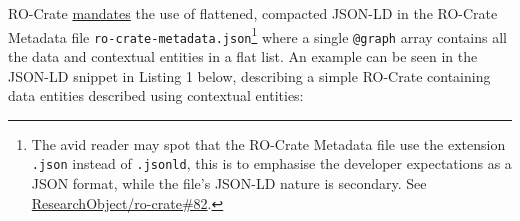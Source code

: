 {RO-Crate
\href{https://www.researchobject.org/ro-crate/1.1/appendix/jsonld.html}{mandates}
the use of flattened, compacted JSON-LD in the RO-Crate Metadata file
\texttt{ro-crate-metadata.json}\footnote{The avid reader may spot that
  the RO-Crate Metadata file use the extension \texttt{.json} instead of
  \texttt{.jsonld}, this is to emphasise the developer expectations as a
  JSON format, while the file's JSON-LD nature is secondary. See
  \href{https://github.com/ResearchObject/ro-crate/issues/82}{ResearchObject/ro-crate\#82}.}
where a single \texttt{@graph} array contains all the data and
contextual entities in a flat list. An example can be seen in the
JSON-LD snippet in Listing 1 below, describing a simple RO-Crate
containing data entities described using contextual entities:

\begin{Shaded}
\begin{Highlighting}[]
\FunctionTok{\{} \FunctionTok{:} \FunctionTok{,}
  \FunctionTok{:} \OtherTok{[}
      \FunctionTok{\{} \FunctionTok{:} \FunctionTok{,}      
        \FunctionTok{:} \FunctionTok{,}
        \FunctionTok{:} \FunctionTok{\{}\FunctionTok{:} \FunctionTok{\},}
        \FunctionTok{:} \FunctionTok{\{}\FunctionTok{:} \FunctionTok{\}}
      \FunctionTok{\}}\OtherTok{,}
      \FunctionTok{\{} \FunctionTok{:} \FunctionTok{,}
        \FunctionTok{:} \FunctionTok{,}
        \FunctionTok{:} \FunctionTok{,}
        \FunctionTok{:} \FunctionTok{\{}\FunctionTok{:} \FunctionTok{\},}
        \FunctionTok{:} \FunctionTok{\{}\FunctionTok{:} \FunctionTok{\},}
        \FunctionTok{:} \FunctionTok{,}
        \FunctionTok{:} \OtherTok{[}
          \FunctionTok{\{}\FunctionTok{:} \FunctionTok{\}}\OtherTok{,}
          \FunctionTok{\{}\FunctionTok{:} \FunctionTok{\}}

\end{Highlighting}
\end{Shaded}}
